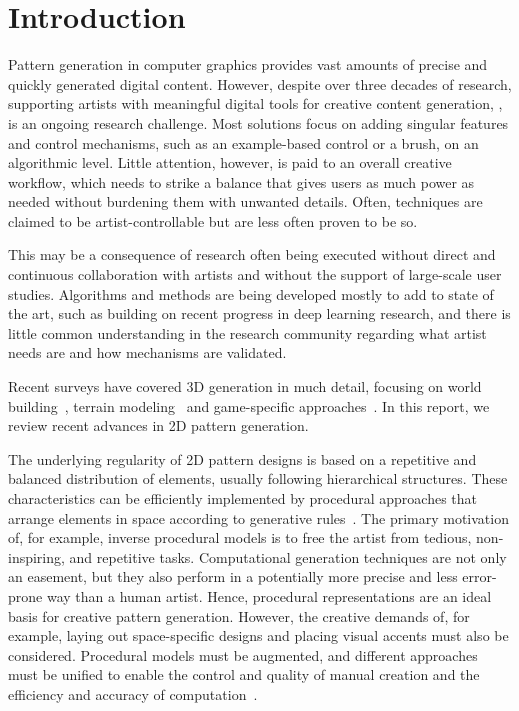 \section{Introduction}
Pattern generation in computer graphics provides vast amounts of precise and quickly generated digital content. However, despite over three decades of research, supporting artists with meaningful digital tools for creative content generation, , is an ongoing research challenge. Most solutions focus on adding singular features and control mechanisms, such as an example-based control or a brush, on an algorithmic level. Little attention, however, is paid to an overall creative workflow, which needs to strike a balance that gives users as much power as needed without burdening them with unwanted details. Often, techniques are claimed to be artist-controllable but are less often proven to be so.

This may be a consequence of research often being executed without direct and continuous collaboration with artists and without the support of large-scale user studies. Algorithms and methods are being developed mostly to add to state of the art, such as building on recent progress in deep learning research, and there is little common understanding in the research community regarding what artist needs are and how mechanisms are validated.

Recent surveys have covered 3D generation in much detail, focusing on  world building~\cite{smelik_2014_aso, aliaga_2016_ipm}, terrain modeling~\cite{galin_2019_aro} and game-specific approaches~\cite{hendrikx_2013_pcg, togelius_2011_sbp}. In this report, we review recent advances in 2D pattern generation. 

The underlying regularity of 2D pattern designs is based on a repetitive and balanced distribution of elements, usually following hierarchical structures. These characteristics can be efficiently implemented by procedural approaches that arrange elements in space according to generative rules~\cite{stava_2010_ipm}. The primary motivation of, for example, inverse procedural models is to free the artist from tedious, non-inspiring, and repetitive tasks. Computational generation techniques are not only an easement, but they also perform in a potentially more precise and less error-prone way than a human artist. Hence, procedural representations are an ideal basis for creative pattern generation. However, the creative demands of, for example, laying out space-specific designs and placing visual accents must also be considered. Procedural models must be augmented, and different approaches must be unified to enable the control and quality of manual creation and the efficiency and accuracy of computation~\cite{gieseke_2017_ooo}. 


